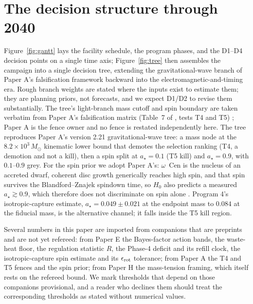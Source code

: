 \documentclass[11pt]{article}
\newcommand{\msun}{\ensuremath{M_\odot}}
\newcommand{\astar}{\ensuremath{a_\star}}
\newcommand{\ocen}{\ensuremath{\omega}~Cen}
\begin{document}
\section{The decision structure through 2040}
\label{sec:decision}

Figure~\ref{fig:gantt} lays the facility schedule, the program phases, and the D1--D4 decision points on a single time axis; Figure~\ref{fig:tree} then assembles the campaign into a single decision tree, extending the gravitational-wave branch of Paper A's falsification framework backward into the electromagnetic-and-timing era. Rough branch weights are stated where the inputs exist to estimate them; they are planning priors, not forecasts, and we expect D1/D2 to revise them substantially. The tree's light-branch mass cutoff and spin boundary are taken verbatim from Paper A's falsification matrix (Table~7 of \citealt{Swanson2026MTH}, tests T4 and T5) %
; Paper A is the fence owner and no fence is restated independently here. The tree reproduces Paper A's version 2.21 gravitational-wave tree: a mass node at the $8.2\times10^{3}\,\msun$ kinematic lower bound that demotes the selection ranking (T4, a demotion and not a kill), then a spin split at $\astar = 0.1$ (T5 kill) and $\astar = 0.9$, with $0.1$--$0.9$ grey. For the spin prior we adopt Paper A's: \ocen{} is the nucleus of an accreted dwarf, coherent disc growth generically reaches high spin, and that spin survives the Blandford--Znajek spindown time, so $H_0$ also predicts a measured $\astar \gtrsim 0.9$, which therefore does not discriminate on spin alone \citep{Swanson2026MTH}. Program 4's isotropic-capture estimate, $\astar = 0.049\pm0.021$ at the endpoint mass to $0.084$ at the fiducial mass, is the alternative channel; it falls inside the T5 kill region.

Several numbers in this paper are imported from companions that are preprints and are not yet refereed: from Paper E the Bayes-factor action bands, the waste-heat floor, the regulation statistic $R$, the Phase-4 deficit and its refill clock, the isotropic-capture spin estimate and its $\epsilon_{\rm rot}$ tolerance; from Paper A the T4 and T5 fences and the spin prior; from Paper H the mass-tension framing, which itself rests on the refereed \citealt{Haberle2024Nature} bound. We mark thresholds that depend on those companions provisional, and a reader who declines them should treat the corresponding thresholds as stated without numerical values.
\end{document}
